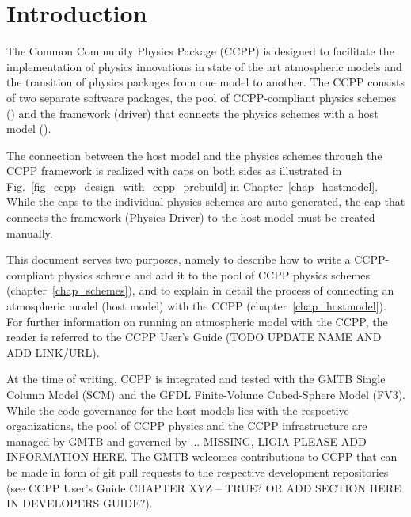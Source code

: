 \chapter{Introduction}\label{chap_introduction}
\setlength{\parskip}{12pt}

The Common Community Physics Package (CCPP) is designed to facilitate the implementation of physics innovations in state of the art atmospheric models and the transition of physics packages from one model to another. The CCPP consists of two separate software packages, the pool of CCPP-compliant physics schemes () and the framework (driver) that connects the physics schemes with a host model ().

The connection between the host model and the physics schemes through the CCPP framework is realized with caps on both sides as illustrated in Fig.~\ref{fig_ccpp_design_with_ccpp_prebuild} in Chapter~\ref{chap_hostmodel}. While the caps to the individual physics schemes are auto-generated, the cap that connects the framework (Physics Driver) to the host model must be created manually.

This document serves two purposes, namely to describe how to write a CCPP-compliant physics scheme and add it to the pool of CCPP physics schemes (chapter~\ref{chap_schemes}), and to explain in detail the process of connecting an atmospheric model (host model) with the CCPP (chapter~\ref{chap_hostmodel}). For further information on running an atmospheric model with the CCPP, the reader is referred to the CCPP User's Guide ({\red TODO UPDATE NAME AND ADD LINK/URL}).

At the time of writing, CCPP is integrated and tested with the GMTB Single Column Model (SCM) and the GFDL Finite-Volume Cubed-Sphere Model (FV3). While the code governance for the host models lies with the respective organizations, the pool of CCPP physics and the CCPP infrastructure are managed by GMTB and governed by ... {\red MISSING, LIGIA PLEASE ADD INFORMATION HERE}. The GMTB welcomes contributions to CCPP that can be made in form of git pull requests to the respective development repositories (see {\red CCPP User's Guide CHAPTER XYZ -- TRUE? OR ADD SECTION HERE IN DEVELOPERS GUIDE?}).
